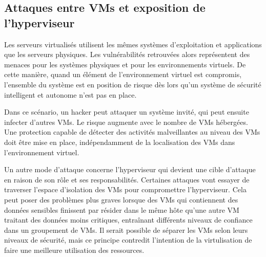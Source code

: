 \subsection{Attaques entre VMs et exposition de l'hyperviseur}

Les serveurs virtualisés utilisent les mêmes systèmes d'exploitation et applications que les serveurs physiques. Les vulnérabilités retrouvées alors représentent des menaces pour les systèmes physiques et pour les environnements virtuels. De cette manière, quand un élément de l'environnement virtuel est compromis, l'ensemble du système est en position de risque dès lors qu'un système de sécurité intelligent et autonome n'est pas en place. 

Dans ce scénario, un hacker peut attaquer un système invité, qui peut ensuite infecter d'autres VMs. Le risque augmente avec le nombre de VMs hébergées. Une protection capable de détecter des activités malveillantes au niveau des VMs doit être mise en place, indépendamment de la localisation des VMs dans l'environnement virtuel.

Un autre mode d'attaque concerne l'hyperviseur qui devient une cible d'attaque en raison de son rôle et ses responsabilités. Certaines attaques vont essayer de traverser l'espace d'isolation des VMs pour compromettre l'hyperviseur. Cela peut poser des problèmes plus graves lorsque des VMs qui contiennent des données sensibles finissent par résider dans le même hôte qu'une autre VM traitant des données moins critiques, entraînant différents niveaux de confiance dans un groupement de VMs. Il serait possible de séparer les VMs selon leurs niveaux de sécurité, mais ce principe contredit l'intention de la virtulisation de faire une meilleure utilisation des ressources. 

